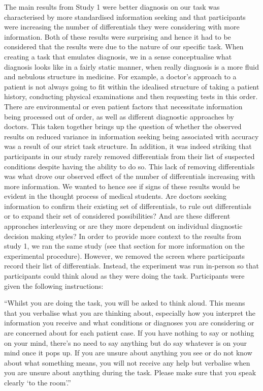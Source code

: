 \documentclass[a4paper, nobind]{templates/ociamthesis}
\begin{document}
\adjustmtc
{}

The main results from Study 1 were better diagnosis on our task was characterised by more standardised information seeking and that participants were increasing the number of differentials they were considering with more information. Both of these results were surprising and hence it had to be considered that the results were due to the nature of our specific task. When creating a task that emulates diagnosis, we in a sense conceptualise what diagnosis looks like in a fairly static manner, when really diagnosis is a more fluid and nebulous structure in medicine. For example, a doctor's approach to a patient is not always going to fit within the idealised structure of taking a patient history, conducting physical examinations and then requesting tests in this order. There are environmental or even patient factors that necessitate information being processed out of order, as well as different diagnostic approaches by doctors. This taken together brings up the question of whether the observed results on reduced variance in information seeking being associated with accuracy was a result of our strict task structure. In addition, it was indeed striking that participants in our study rarely removed differentials from their list of suspected conditions despite having the ability to do so. This lack of removing differentials was what drove our observed effect of the number of differentials increasing with more information. We wanted to hence see if signs of these results would be evident in the thought process of medical students. Are doctors seeking information to confirm their existing set of differentials, to rule out differentials or to expand their set of considered possibilities? And are these different approaches interleaving or are they more dependent on individual diagnostic decision making styles? In order to provide more context to the results from study 1, we ran the same study (see that section for more information on the experimental procedure). However, we removed the screen where participants record their list of differentials. Instead, the experiment was run in-person so that participants could think aloud as they were doing the task. Participants were given the following instructions:

``Whilst you are doing the task, you will be asked to think aloud. This means that you verbalise what you are thinking about, especially how you interpret the information you receive and what conditions or diagnoses you are considering or are concerned about for each patient case. If you have nothing to say or nothing on your mind, there's no need to say anything but do say whatever is on your mind once it pops up. If you are unsure about anything you see or do not know about what something means, you will not receive any help but verbalise when you are unsure about anything during the task. Please make sure that you speak clearly `to the room'.''
\end{document}
